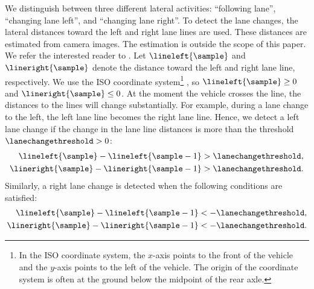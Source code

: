 We distinguish between three different lateral activities: ``following lane'', ``changing lane left'', and ``changing lane right''. 
To detect the lane changes, the lateral distances toward the left and right lane lines are used. 
These distances are estimated from camera images. 
The estimation is outside the scope of this paper. 
We refer the interested reader to \cite{elfring2016effective}.
Let $\lineleft{\sample}$ and $\lineright{\sample}$ denote the distance toward the left and right lane line, respectively. 
We use the ISO coordinate system\footnote{In the ISO coordinate system, the $x$-axis points to the front of the vehicle and the $y$-axis points to the left of the vehicle. The origin of the coordinate system is often at the ground below the midpoint of the rear axle.} \autocite{iso8855}, so $\lineleft{\sample} \geq 0$ and $\lineright{\sample} \leq 0$. 
At the moment the vehicle crosses the line, the distances to the lines will change substantially. 
For example, during a lane change to the left, the left lane line becomes the right lane line. 
Hence, we detect a left lane change if the change in the lane line distances is more than the threshold $\lanechangethreshold>0$:
\begin{align}
\lineleft{\sample} - \lineleft{\sample-1} &> \lanechangethreshold, \label{eq:potential left a} \\
\lineright{\sample} - \lineright{\sample-1} &> \lanechangethreshold. \label{eq:potential left b}
\end{align}
Similarly, a right lane change is detected when the following conditions are satisfied:
\begin{align}
	\lineleft{\sample} - \lineleft{\sample-1} &< -\lanechangethreshold, \label{eq:potential right a}\\
	\lineright{\sample} - \lineright{\sample-1} &< -\lanechangethreshold. \label{eq:potential right b}
\end{align}


